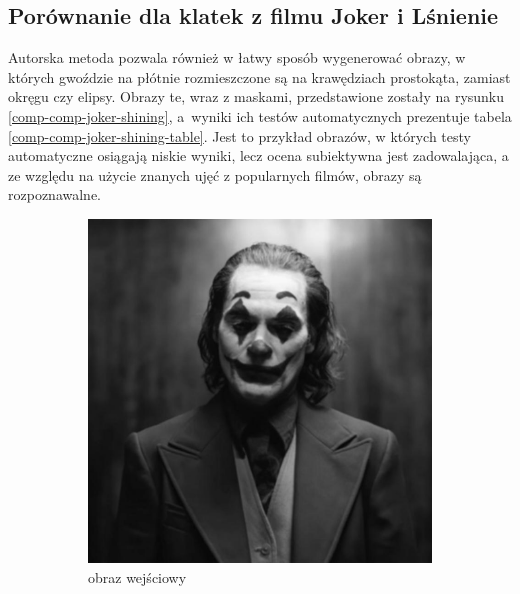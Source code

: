         \subsection{Porównanie dla klatek z filmu Joker i Lśnienie}
    	Autorska metoda pozwala również w łatwy sposób wygenerować obrazy, w których gwoździe na płótnie rozmieszczone są na krawędziach prostokąta, zamiast okręgu czy elipsy. Obrazy te, wraz z maskami, przedstawione zostały na rysunku \ref{comp-comp-joker-shining}, a~wyniki ich testów automatycznych prezentuje tabela \ref{comp-comp-joker-shining-table}. Jest to przykład obrazów, w których testy automatyczne osiągają niskie wyniki, lecz ocena subiektywna jest zadowalająca, a ze względu na użycie znanych ujęć z popularnych filmów, obrazy są rozpoznawalne.
    	\begin{figure}[H] 
        \centering
        \begin{subfigure}{0.205\textwidth}
            \centering
            \includegraphics[width = \textwidth]{img/6-comp/joker_original_c10_inv0.png}
            \caption{obraz wejściowy\\\hphantom{ }}
            \label{comp-comp-joker-shining-a}
        \end{subfigure}
        \begin{subfigure}{0.205\textwidth}
            \centering

\end{subfigure}
\end{figure}
